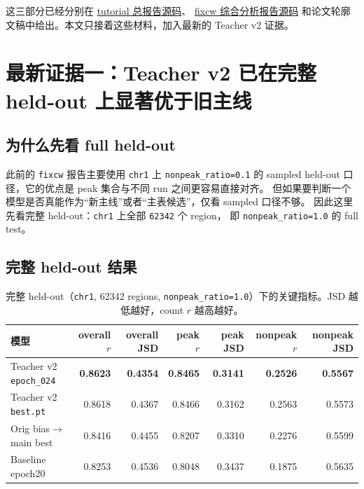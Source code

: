 \documentclass[11pt,a4paper]{ctexart}
\begin{document}
这三部分已经分别在
\href{/home/zhengwei/project/python/TransChromBP/reports/paper/transchrombp_tutorial_consolidated_cn.tex}{tutorial 总报告源码}、
\href{/home/zhengwei/project/python/TransChromBP/reports/paper/fixcw_crossmodel_analysis_20260317.tex}{fixcw 综合分析报告源码}
和论文轮廓文稿中给出。本文只接着这些材料，加入最新的 Teacher v2 证据。

\section{最新证据一：Teacher v2 已在完整 held-out 上显著优于旧主线}

\subsection{为什么先看 full held-out}

此前的 \texttt{fixcw} 报告主要使用 \texttt{chr1} 上
\texttt{nonpeak\_ratio=0.1} 的 sampled held-out 口径，它的优点是 peak 集合与不同 run 之间更容易直接对齐。
但如果要判断一个模型是否真能作为“新主线”或者“主表候选”，仅看 sampled 口径不够。
因此这里先看完整 held-out：\texttt{chr1} 上全部 \texttt{62342} 个 region，
即 \texttt{nonpeak\_ratio=1.0} 的 full test。

\subsection{完整 held-out 结果}

\begin{table}[H]
\centering
\small
\caption{完整 held-out（\texttt{chr1}, 62342 regions, \texttt{nonpeak\_ratio=1.0}）下的关键指标。JSD 越低越好，count $r$ 越高越好。}
\begin{tabular}{lrrrrrr}
\toprule
模型 & overall $r$ & overall JSD & peak $r$ & peak JSD & nonpeak $r$ & nonpeak JSD \\
\midrule
Teacher v2 \texttt{epoch\_024} & \textbf{0.8623} & \textbf{0.4354} & \textbf{0.8465} & \textbf{0.3141} & \textbf{0.2526} & \textbf{0.5567} \\
Teacher v2 \texttt{best.pt} & 0.8618 & 0.4367 & 0.8466 & 0.3162 & 0.2563 & 0.5573 \\
Orig bias$\to$main best & 0.8416 & 0.4455 & 0.8207 & 0.3310 & 0.2276 & 0.5599 \\
Baseline epoch20 & 0.8253 & 0.4536 & 0.8048 & 0.3437 & 0.1875 & 0.5635 \\
\bottomrule
\end{tabular}
\end{table}
\end{document}
